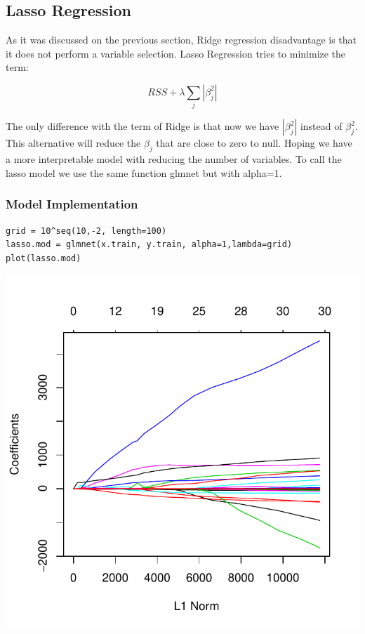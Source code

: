 \documentclass[]{report}
\begin{document}
\subsection{Lasso Regression}
As it was discussed on the previous section, Ridge regression disadvantage is that it does not perform a variable selection. Lasso Regression tries to minimize the term:

\begin{equation} \label{eq2}
	RSS + \lambda \sum_{j}{|\beta_{j}^{2}|}
\end{equation}	

The only difference with the term of Ridge is that now we have $|\beta_{j}^{2}|$ instead of $\beta_{j}^{2}$. This alternative will reduce the $\beta_{j}$ that are close to zero to null.
Hoping we have a more interpretable model with reducing the number of variables. To call the lasso model we use the same function glmnet but with alpha=1.
 
\subsubsection{Model Implementation}
\begin{lstlisting}
grid = 10^seq(10,-2, length=100)
lasso.mod = glmnet(x.train, y.train, alpha=1,lambda=grid)
plot(lasso.mod)
\end{lstlisting}

\begin{center}
	\includegraphics{Figures/lasso_coeff.pdf}
\end{center}
\end{document}
